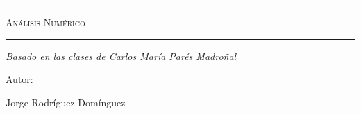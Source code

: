\begin{titlepage}
    \centering
    {\bfseries\LARGE \ \par}
    \vspace{1cm}
    {\scshape\Large \ \par}
    \vspace{3cm}
    \rule{\linewidth}{0.5mm}
    {\scshape\Huge Análisis Numérico \par}
    \rule{\linewidth}{0.5mm} \par
    \vspace{3cm}
    {\itshape\Large Basado en las clases de Carlos María Parés Madroñal \par}
    \vfill
    {\Large Autor: \par}
    {\Large Jorge Rodríguez Domínguez \par}
    \vfill
\end{titlepage}
\tableofcontents